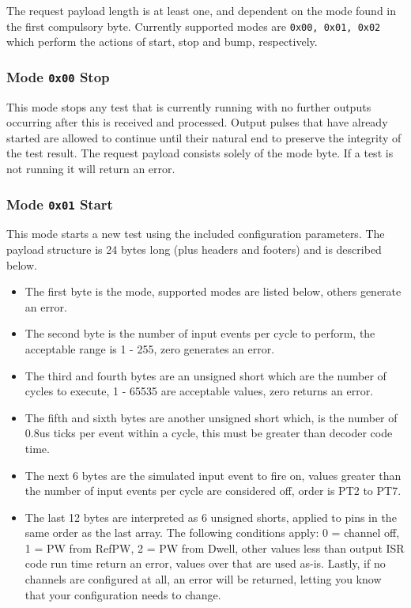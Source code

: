 \documentclass[12pt,a4paper,titlepage]{article}
\begin{document}
The request payload length is at least one, and dependent on the mode found in the first compulsory byte. Currently supported modes are \texttt{0x00, 0x01, 0x02} which perform the actions of start, stop and bump, respectively.

\subsubsection{Mode \texttt{0x00} Stop}

This mode stops any test that is currently running with no further outputs occurring after this is received and processed. Output pulses that have already started are allowed to continue until their natural end to preserve the integrity of the test result. The request payload consists solely of the mode byte. If a test is not running it will return an error.

\subsubsection{Mode \texttt{0x01} Start}

This mode starts a new test using the included configuration parameters. The payload structure is 24 bytes long (plus headers and footers) and is described below.

\begin{itemize}
\item The first byte is the mode, supported modes are listed below, others generate an error.
\item The second byte is the number of input events per cycle to perform, the acceptable range is 1 - 255, zero generates an error.
\item The third and fourth bytes are an unsigned short which are the number of cycles to execute, 1 - 65535 are acceptable values, zero returns an error.
\item The fifth and sixth bytes are another unsigned short which, is the number of 0.8us ticks per event within a cycle, this must be greater than decoder code time.
\item The next 6 bytes are the simulated input event to fire on, values greater than the number of input events per cycle are considered off, order is PT2 to PT7.
\item The last 12 bytes are interpreted as 6 unsigned shorts, applied to pins in the same order as the last array. The following conditions apply: 0 = channel off, 1 = PW from RefPW, 2 = PW from Dwell, other values less than output ISR code run time return an error, values over that are used as-is. Lastly, if no channels are configured at all, an error will be returned, letting you know that your configuration needs to change.
\end{itemize}
\end{document}

